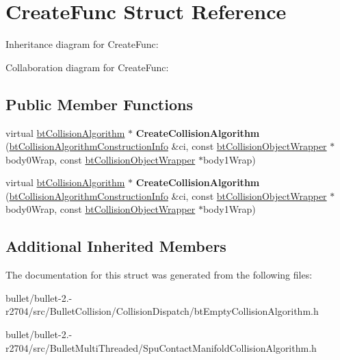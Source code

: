 \hypertarget{struct_create_func}{\section{Create\+Func Struct Reference}
\label{struct_create_func}
}


Inheritance diagram for Create\+Func\+:


Collaboration diagram for Create\+Func\+:
\subsection*{Public Member Functions}
\begin{DoxyCompactItemize}
\item 
\hypertarget{struct_create_func_ac51b1ed6b911ba951d9f608886e60c92}{virtual \hyperlink{classbt_collision_algorithm}{bt\+Collision\+Algorithm} $\ast$ {\bfseries Create\+Collision\+Algorithm} (\hyperlink{structbt_collision_algorithm_construction_info}{bt\+Collision\+Algorithm\+Construction\+Info} \&ci, const \hyperlink{structbt_collision_object_wrapper}{bt\+Collision\+Object\+Wrapper} $\ast$body0\+Wrap, const \hyperlink{structbt_collision_object_wrapper}{bt\+Collision\+Object\+Wrapper} $\ast$body1\+Wrap)}\label{struct_create_func_ac51b1ed6b911ba951d9f608886e60c92}

\item 
\hypertarget{struct_create_func_ac51b1ed6b911ba951d9f608886e60c92}{virtual \hyperlink{classbt_collision_algorithm}{bt\+Collision\+Algorithm} $\ast$ {\bfseries Create\+Collision\+Algorithm} (\hyperlink{structbt_collision_algorithm_construction_info}{bt\+Collision\+Algorithm\+Construction\+Info} \&ci, const \hyperlink{structbt_collision_object_wrapper}{bt\+Collision\+Object\+Wrapper} $\ast$body0\+Wrap, const \hyperlink{structbt_collision_object_wrapper}{bt\+Collision\+Object\+Wrapper} $\ast$body1\+Wrap)}\label{struct_create_func_ac51b1ed6b911ba951d9f608886e60c92}

\end{DoxyCompactItemize}
\subsection*{Additional Inherited Members}


The documentation for this struct was generated from the following files\+:\begin{DoxyCompactItemize}
\item 
bullet/bullet-\/2.-\/r2704/src/\+Bullet\+Collision/\+Collision\+Dispatch/bt\+Empty\+Collision\+Algorithm.\+h\item 
bullet/bullet-\/2.-\/r2704/src/\+Bullet\+Multi\+Threaded/Spu\+Contact\+Manifold\+Collision\+Algorithm.\+h\end{DoxyCompactItemize}
